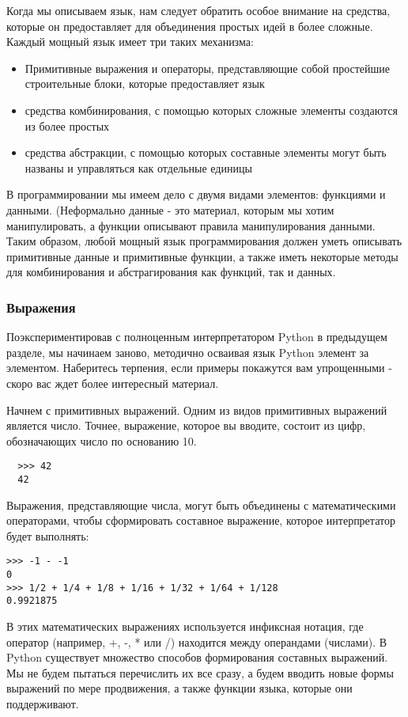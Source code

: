 Когда мы описываем язык, нам следует обратить особое внимание на средства, которые он предоставляет для объединения простых идей в более сложные. Каждый мощный язык имеет три таких механизма:
\begin{itemize}
  \item Примитивные выражения и операторы, представляющие собой простейшие строительные блоки, которые предоставляет язык
  \item средства комбинирования, с помощью которых сложные элементы создаются из более простых
  \item средства абстракции, с помощью которых составные элементы могут быть названы и управляться как отдельные единицы
  \end{itemize}

В программировании мы имеем дело с двумя видами элементов: функциями и данными. (Неформально данные - это материал, которым мы хотим манипулировать, а функции описывают правила манипулирования данными. Таким образом, любой мощный язык программирования должен уметь описывать примитивные данные и примитивные функции, а также иметь некоторые методы для комбинирования и абстрагирования как функций, так и данных.

\subsubsection{Выражения}
Поэкспериментировав с полноценным интерпретатором Python в предыдущем разделе, мы начинаем заново, методично осваивая язык Python элемент за элементом. Наберитесь терпения, если примеры покажутся вам упрощенными - скоро вас ждет более интересный материал.

Начнем с примитивных выражений. Одним из видов примитивных выражений является число. Точнее, выражение, которое вы вводите, состоит из цифр, обозначающих число по основанию 10.
\begin{verbatim}
  >>> 42
  42
  \end{verbatim}

Выражения, представляющие числа, могут быть объединены с математическими операторами, чтобы сформировать составное выражение, которое интерпретатор будет выполнять:
\begin{verbatim}
>>> -1 - -1
0
>>> 1/2 + 1/4 + 1/8 + 1/16 + 1/32 + 1/64 + 1/128
0.9921875
  \end{verbatim}

В этих математических выражениях используется инфиксная нотация, где оператор (например, +, -, * или /) находится между операндами (числами). В Python существует множество способов формирования составных выражений. Мы не будем пытаться перечислить их все сразу, а будем вводить новые формы выражений по мере продвижения, а также функции языка, которые они поддерживают.

